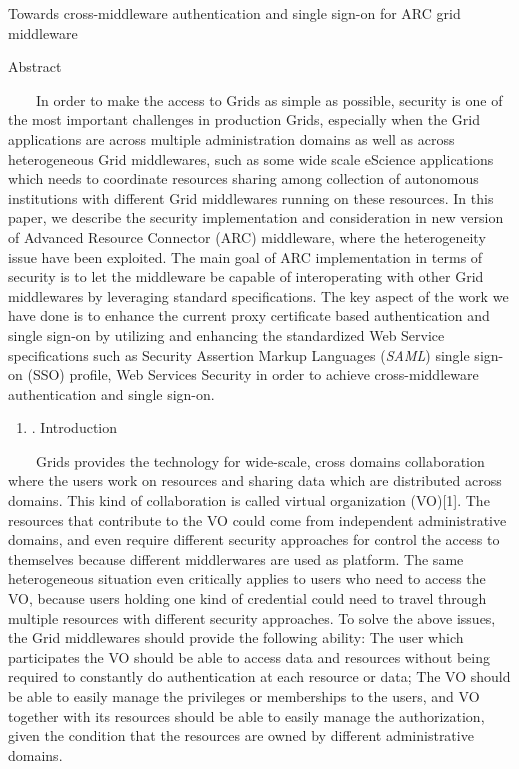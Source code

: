 \documentclass{article}
\title{}
\newcommand\liststyleLi{%
\renewcommand\theenumi{\arabic{enumi}}
\renewcommand\theenumii{\arabic{enumii}}
\renewcommand\theenumiii{\arabic{enumiii}}
\renewcommand\theenumiv{\arabic{enumiv}}
\renewcommand\labelenumi{\theenumi.}
\renewcommand\labelenumii{\theenumii.}
\renewcommand\labelenumiii{\theenumiii.}
\renewcommand\labelenumiv{\theenumiv.}
}
\begin{document}
{\centering
Towards cross-middleware authentication and single sign-on for ARC grid
middleware
\par}


\bigskip

{\centering
Abstract
\par}

\ \ \ \ In order to make the access to Grids as simple as possible,
security is one of the most important challenges in production Grids,
especially when the Grid applications are across multiple
administration domains as well as across heterogeneous Grid
middlewares, such as some wide scale eScience applications which needs
to coordinate resources sharing among collection of autonomous
institutions with different Grid middlewares running on these
resources. In this paper, we describe the security implementation and
consideration in new version of Advanced Resource Connector (ARC)
middleware, where the heterogeneity issue have been exploited. The main
goal of ARC implementation in terms of security is to let the
middleware be capable of interoperating with other Grid middlewares by
leveraging standard specifications. The key aspect of the work we have
done is to enhance the current proxy certificate based authentication
and single sign-on by utilizing and enhancing the standardized Web
Service specifications such as Security Assertion Markup Languages
(\textit{SAML}) single sign-on (SSO) profile, Web Services Security in
order to achieve cross-middleware authentication and single sign-on.


\bigskip

\liststyleLi
\begin{enumerate}
\item[] {. Introduction
\par}
\end{enumerate}
\ \ \ \ Grids provides the technology for wide-scale, cross domains
collaboration where the users work on resources and sharing data which
are distributed across domains. This kind of collaboration is called
virtual organization (VO)[1]. The resources that contribute to the VO
could come from independent administrative domains, and even require
different security approaches for control the access to themselves
because different middlerwares are used as platform. The same
heterogeneous situation even critically applies to users who need to
access the VO, because users holding one kind of credential could need
to travel through multiple resources with different security
approaches. To solve the above issues, the Grid middlewares should
provide the following ability: The user which participates the VO
should be able to access data and resources without being required to
constantly do authentication at each resource or data; The VO should be
able to easily manage the privileges or memberships to the users, and
VO together with its resources should be able to easily manage the
authorization, given the condition that the resources are owned by
different administrative domains.
\end{document}
